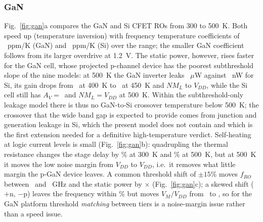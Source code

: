\documentclass[journal]{IEEEtran}
\begin{document}
\subsubsection{GaN}
Fig.~\ref{fig:gan}a compares the GaN and Si CFET ROs from 300 to 500~K. Both speed up (temperature inversion) with frequency temperature coefficients of \tcfgan~ppm/K (GaN) and \tcfsi~ppm/K (Si) over the range; the smaller GaN coefficient follows from its larger overdrive at 1.2~V. The static power, however, rises faster for the GaN cell, whose projected p-channel device has the poorest subthreshold slope of the nine models: at 500~K the GaN inverter leaks \ganPstatFiveHundred~$\mu$W against \siPstatFiveHundred~nW for Si, its gain drops from \ganGainFourHundred\ at 400~K to \ganGainFourFifty\ at 450~K and $NM_L$ to \ganNMLFourFifty$V_{DD}$, while the Si cell still has $A_V=$\siGainFiveHundred\ and $NM_L=$\siNMLFiveHundred$V_{DD}$ at 500~K. Within the subthreshold-only leakage model there is thus no GaN-to-Si crossover temperature below 500~K; the crossover that the wide band gap is expected to provide comes from junction and generation leakage in Si, which the present model does not contain and which is the first extension needed for a definitive high-temperature verdict. Self-heating at logic current levels is small (Fig.~\ref{fig:gan}b): quadrupling the thermal resistance changes the stage delay by \rthPenaltyThree\% at 300~K and \rthPenaltyFive\% at 500~K, but at 500~K it moves the low noise margin from \rthNMLfiveNom$V_{DD}$ to \rthNMLfiveFour$V_{DD}$, i.e.\ it removes what little margin the p-GaN device leaves. A common threshold shift of $\pm15$\% moves $f_{RO}$ between \vthFplus\ and \vthFminus~GHz and the static power by \vthPratio$\times$ (Fig.~\ref{fig:gan}c); a skewed shift ($+$n, $-$p) leaves the frequency within \skewFspread\% but moves $V_M/V_{DD}$ from \skewVMlo\ to \skewVMhi, so for the GaN platform threshold \emph{matching} between tiers is a noise-margin issue rather than a speed issue.
\end{document}
